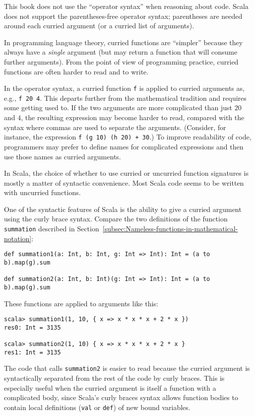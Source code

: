 This book does not use the \textsf{``}operator syntax\textsf{''} when reasoning about
code. Scala does not support the parentheses-free operator syntax;
parentheses are needed around each curried argument (or a curried
list of arguments).

In programming language theory, curried functions are \textsf{``}simpler\textsf{''}
because they always have a \emph{single} argument (but may return
a function that will consume further arguments). From the point of
view of programming practice, curried functions are often harder to
read and to write.

In the operator syntax, a curried function \lstinline!f! is applied
to curried arguments as, e.g., \lstinline!f 20 4!. This departs further
from the mathematical tradition and requires some getting used to.
If the two arguments are more complicated than just $20$ and $4$,
the resulting expression may become harder to read, compared with
the syntax where commas are used to separate the arguments. (Consider,
for instance, the expression \lstinline!f (g 10) (h 20) + 30!.) To
improve readability of code, programmers may prefer to define names
for complicated expressions and then use those names as curried arguments.

In Scala, the choice of whether to use curried or uncurried function
signatures is mostly a matter of syntactic convenience. Most Scala
code seems to be written with uncurried functions.

One of the syntactic features of Scala is the ability to give a curried
argument using the curly brace syntax. Compare the two definitions
of the function \lstinline!summation! described in Section~\ref{subsec:Nameless-functions-in-mathematical-notation}:
\begin{lstlisting}
def summation1(a: Int, b: Int, g: Int => Int): Int = (a to b).map(g).sum

def summation2(a: Int, b: Int)(g: Int => Int): Int = (a to b).map(g).sum
\end{lstlisting}
These functions are applied to arguments like this:
\begin{lstlisting}
scala> summation1(1, 10, { x => x * x * x + 2 * x })
res0: Int = 3135

scala> summation2(1, 10) { x => x * x * x + 2 * x }
res1: Int = 3135
\end{lstlisting}
The code that calls \lstinline!summation2! is easier to read because
the curried argument is syntactically separated from the rest of the
code by curly braces. This is especially useful when the curried argument
is itself a function with a complicated body, since Scala\textsf{'}s curly
braces syntax allows function bodies to contain local definitions
(\lstinline!val! or \lstinline!def!) of new bound variables.


